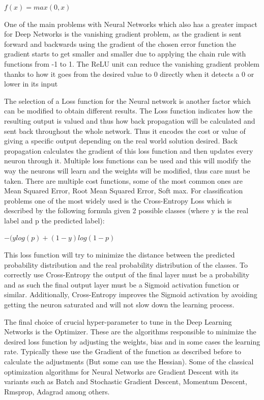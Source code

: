 \begin{center}
	$f(x)= max(0,x)$
\end{center}

One of the main problems with Neural Networks which also has a greater impact for Deep Networks is the vanishing gradient problem, as the gradient is sent forward and backwards using the gradient of the chosen error function the gradient starts to get smaller and smaller due to applying the chain rule with functions from -1 to 1.  The ReLU unit can reduce the vanishing gradient problem thanks to how it goes from the desired value to 0 directly when it detects a 0 or lower in its input

The selection of a Loss function for the Neural network is another factor which can be modified to obtain different results. The Loss function indicates how the resulting output is valued and thus how back propagation will be calculated and sent back throughout the whole network. Thus it encodes the cost or value of giving a specific output depending on the real world solution desired. Back propagation calculates the gradient of this loss function and then updates every neuron through it. Multiple loss functions can be used and this will modify the way the neurons will learn and the weights will be modified, thus care must be taken. There are multiple cost functions, some of the most common ones are Mean Squared Error, Root Mean Squared Error, Soft max. For classification problems one of the most widely used is the Cross-Entropy Loss which is described by the following formula given 2 possible classes (where y is the real label and p the predicted label):

\begin{center}
	$-(ylog(p)+(1-y)log(1-p)$
\end{center}

This loss function will try to minimize the distance between the predicted probability distribution and the real probability distribution of the classes. To correctly use Cross-Entropy the output of the final layer must be a probability and as such the final output layer must be a Sigmoid activation function or similar. Additionally, Cross-Entropy improves the Sigmoid activation by avoiding getting the neuron saturated and will not slow down the learning process.

The final choice of crucial hyper-parameter to tune in the Deep Learning Networks is the Optimizer. These are the algorithms responsible to minimize the desired loss function by adjusting the weights, bias and in some cases the learning rate. Typically these use the Gradient of the function as described before to calculate the adjustments (But some can use the Hessian). Some of the classical optimization algorithms for Neural Networks are Gradient Descent with its variants such as Batch and Stochastic Gradient Descent, Momentum Descent, Rmsprop, Adagrad among others. 

